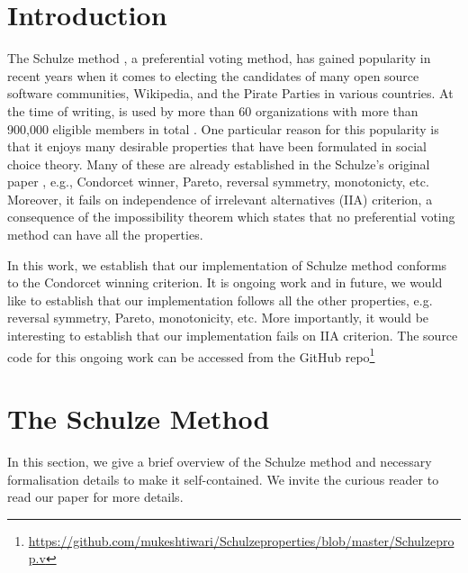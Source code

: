 \documentclass[compsoc,conference,a4paper,10pt,times]{IEEEtran}
\begin{document}
 
\section{Introduction}
    The Schulze method \cite{Schulze:2011:NMC}, a preferential
    voting method, has gained popularity in recent years
   when it comes to electing the candidates of many open source 
    software communities, Wikipedia, and the Pirate Parties in
    various countries. At the time of writing, 
    is used by more  than  60 organizations  with  more  than  900,000  eligible  
    members  in  total \cite{schulze2020schulze}. One particular reason for this popularity is that it 
    enjoys many desirable properties that have been  formulated in
    social choice theory.
    Many of these are already established in the Schulze's original paper \cite{Schulze:2011:NMC}, e.g., Condorcet winner, Pareto, reversal symmetry, monotonicty, 
    etc. Moreover, it fails on independence of 
    irrelevant alternatives (IIA) criterion, a consequence of the impossibility theorem \cite{arrow1950difficulty} which states that no preferential voting 
    method can have all the properties. 

    In this work, we establish that our implementation of Schulze method \cite{Pattinson:2017:SVE}
    conforms to the Condorcet winning criterion. It is ongoing work and in  
    future, we would like to establish that our implementation follows all the other properties, 
    e.g. reversal symmetry, Pareto, monotonicity, etc. 
    More importantly, it would be interesting to establish that our implementation 
    fails on IIA criterion. The 
    source code for this ongoing work can be accessed from the GitHub 
    repo\footnote{\url{https://github.com/mukeshtiwari/Schulzeproperties/blob/master/Schulzeprop.v}}
    
    \section{The Schulze Method}
    In this section, we give a brief overview of the Schulze method and 
    necessary formalisation details to make it self-contained. We invite the 
    curious reader to read our paper \cite{Pattinson:2017:SVE} for more details. 
    
\end{document}
